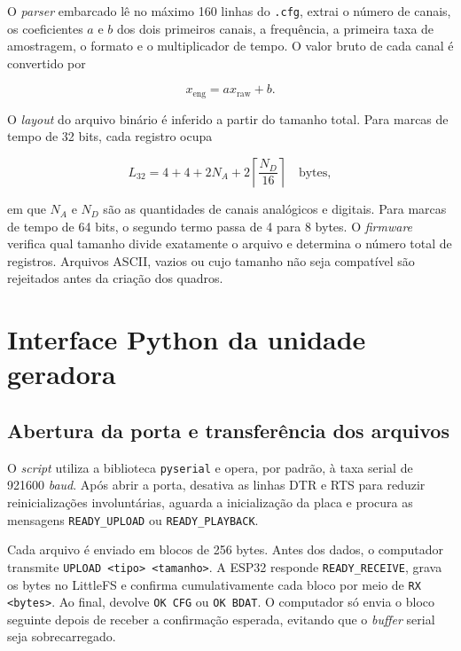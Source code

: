 O \textit{parser} embarcado lê no máximo 160 linhas do \texttt{.cfg}, extrai o número de canais, os coeficientes $a$ e $b$ dos dois primeiros canais, a frequência, a primeira taxa de amostragem, o formato e o multiplicador de tempo. O valor bruto de cada canal é convertido por

\begin{equation}
  x_{\mathrm{eng}}=a x_{\mathrm{raw}}+b.
  \label{eq:comtrade-conversao}
\end{equation}

O \textit{layout} do arquivo binário é inferido a partir do tamanho total. Para marcas de tempo de 32 bits, cada registro ocupa

\begin{equation}
  L_{32}=4+4+2N_A+2\left\lceil\frac{N_D}{16}\right\rceil \quad \text{bytes},
\end{equation}

em que $N_A$ e $N_D$ são as quantidades de canais analógicos e digitais. Para marcas de tempo de 64 bits, o segundo termo passa de 4 para 8 bytes. O \textit{firmware} verifica qual tamanho divide exatamente o arquivo e determina o número total de registros. Arquivos ASCII, vazios ou cujo tamanho não seja compatível são rejeitados antes da criação dos quadros.

\section{Interface Python da unidade geradora}

\subsection{Abertura da porta e transferência dos arquivos}

O \textit{script}  utiliza a biblioteca \texttt{pyserial} e opera, por padrão, à taxa serial de 921600 \textit{baud}. Após abrir a porta, desativa as linhas DTR e RTS para reduzir reinicializações involuntárias, aguarda a inicialização da placa e procura as mensagens \texttt{READY\_UPLOAD} ou \texttt{READY\_PLAYBACK}.

Cada arquivo é enviado em blocos de 256 bytes. Antes dos dados, o computador transmite \texttt{UPLOAD <tipo> <tamanho>}. A ESP32 responde \texttt{READY\_RECEIVE}, grava os bytes no LittleFS e confirma cumulativamente cada bloco por meio de \texttt{RX <bytes>}. Ao final, devolve \texttt{OK CFG} ou \texttt{OK BDAT}. O computador só envia o bloco seguinte depois de receber a confirmação esperada, evitando que o \textit{buffer} serial seja sobrecarregado.

